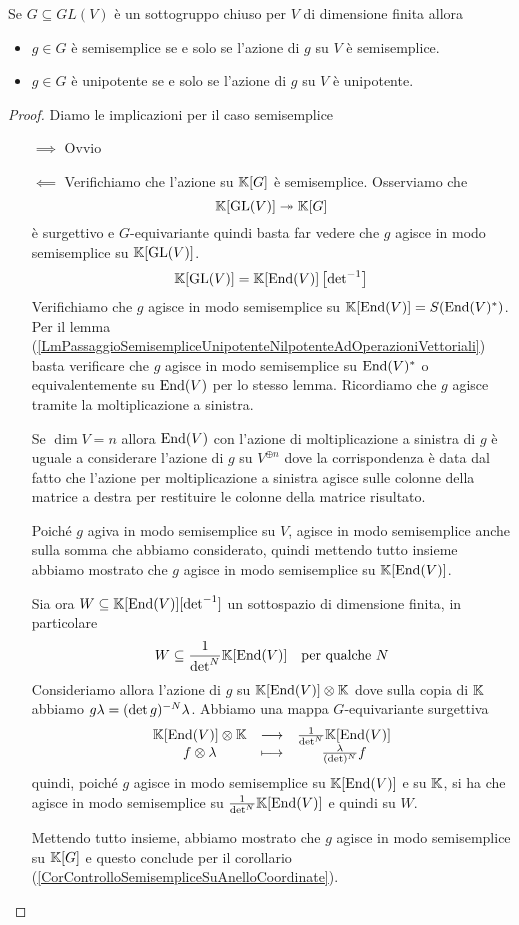 \begin{lemma}\label{LmCriterioSemisempliceUnipotentePerGruppiLineari}
Se $G\subseteq GL(V)$ \`e un sottogruppo chiuso per $V$ di dimensione finita allora
\begin{itemize}
    \item $g\in G$ \`e semisemplice se e solo se l'azione di $g$ su $V$ \`e semisemplice.
    \item $g\in G$ \`e unipotente se e solo se l'azione di $g$ su $V$ \`e unipotente.
\end{itemize}
\end{lemma}
\begin{proof}
Diamo le implicazioni per il caso semisemplice
\setlength{\leftmargini}{0cm}
\begin{itemize}
\item[$\boxed{\implies}$] Ovvio
\item[$\boxed{\impliedby}$] Verifichiamo che l'azione su $\mathbb{K}[G]$ \`e semisemplice. Osserviamo che 
\[\mathbb{K}[\mathrm{GL}(V)]\twoheadrightarrow \mathbb{K}[G]\]
\`e surgettivo e $G$-equivariante quindi basta far vedere che $g$ agisce in modo semisemplice su $\mathbb{K}[\mathrm{GL}(V)]$.
\[\mathbb{K}[\mathrm{GL}(V)]=\mathbb{K}[\operatorname{End}(V)]\left[{{{\det}^{-1}}}\right]\]
Verifichiamo che $g$ agisce in modo semisemplice su $\mathbb{K}[\operatorname{End}(V)]=S(\operatorname{End}(V)^\ast)$. Per il lemma (\ref{LmPassaggioSemisempliceUnipotenteNilpotenteAdOperazioniVettoriali}) basta verificare che $g$ agisce in modo semisemplice su $\operatorname{End}(V)^\ast$ o equivalentemente su $\operatorname{End}(V)$ per lo stesso lemma. Ricordiamo che $g$ agisce tramite la moltiplicazione a sinistra.

Se $\dim V=n$ allora $\operatorname{End}(V)$ con l'azione di moltiplicazione a sinistra di $g$ \`e uguale a considerare l'azione di $g$ su $V^{\oplus n}$ dove la corrispondenza \`e data dal fatto che l'azione per moltiplicazione a sinistra agisce sulle colonne della matrice a destra per restituire le colonne della matrice risultato.

Poich\'e $g$ agiva in modo semisemplice su $V$, agisce in modo semisemplice anche sulla somma che abbiamo considerato, quindi mettendo tutto insieme abbiamo mostrato che $g$ agisce in modo semisemplice su $\mathbb{K}[\operatorname{End}(V)]$.

Sia ora $W\subseteq \mathbb{K}[\operatorname{End}(V)][{\det}^{-1}]$ un sottospazio di dimensione finita, in particolare
\[W\subseteq \frac1{{\det}^N}\mathbb{K}[\operatorname{End}(V)]\quad \text{per qualche }N\]
Consideriamo allora l'azione di $g$ su $\mathbb{K}[\operatorname{End}(V)]\otimes \mathbb{K}$ dove sulla copia di $\mathbb{K}$ abbiamo $g\lambda=(\det g)^{-N}\lambda$. Abbiamo una mappa $G$-equivariante surgettiva
\[\begin{array}{ccc} {\mathbb{K}[\operatorname{End}(V)]\otimes \mathbb{K}} & \longrightarrow & {\frac1{{\det}^N}\mathbb{K}[\operatorname{End}(V)]}\\ {f\otimes \lambda} & \longmapsto & {\frac{\lambda}{(\det)^N}f} \end{array}\]
quindi, poich\'e $g$ agisce in modo semisemplice su $\mathbb{K}[\operatorname{End}(V)]$ e su $\mathbb{K}$, si ha che agisce in modo semisemplice su $\frac1{{\det}^N}\mathbb{K}[\operatorname{End}(V)]$ e quindi su $W$.


Mettendo tutto insieme, abbiamo mostrato che $g$ agisce in modo semisemplice su $\mathbb{K}[G]$ e questo conclude per il corollario (\ref{CorControlloSemisempliceSuAnelloCoordinate}).
\end{itemize}
\setlength{\leftmargini}{0.5cm}
\end{proof}
